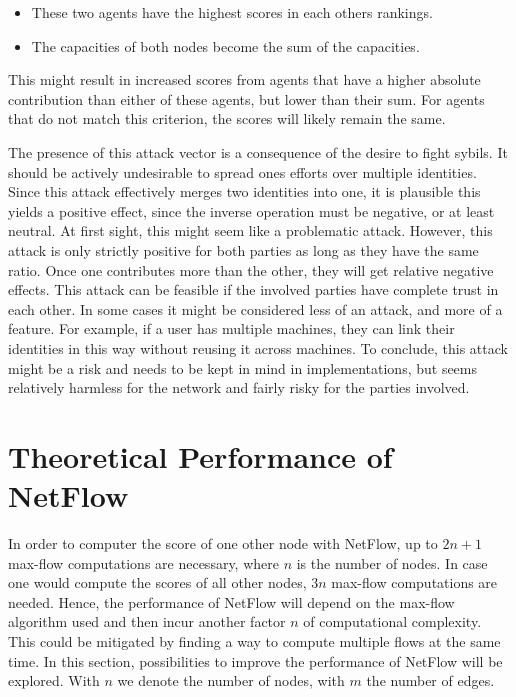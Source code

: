 \documentclass[a4paper,11pt]{book}
\theoremstyle{definition}
\begin{document}
\begin{itemize}
    \item These two agents have the highest scores in each others rankings. 
    \item The capacities of both nodes become the sum of the capacities.
\end{itemize}

This might result in increased scores from agents that have a higher absolute contribution
than either of these agents, but lower than their sum. For agents that do not match this
criterion, the scores will likely remain the same.

The presence of this attack vector is a consequence of the desire to fight sybils. It should be
actively undesirable to spread ones efforts over multiple identities. Since this attack 
effectively merges two identities into one, it is plausible this yields a positive effect,
since the inverse operation must be negative, or at least neutral. At first sight, this
might seem like a problematic attack. However, this attack is only strictly positive for both parties as long
as they have the same ratio. Once one contributes more than the other, they will get relative negative
effects. This attack can be feasible if the involved parties have complete trust in each other. In some
cases it might be considered less of an attack, and more of a feature. For example, if a user
has multiple machines, they can link their identities in this way without reusing it across machines.
To conclude, this attack might be a risk and needs to be kept in mind in implementations, but seems relatively
harmless for the network and fairly risky for the parties involved.


\section{Theoretical Performance of NetFlow}

In order to computer the score of one other node with NetFlow, up to $2n+1$ max-flow
computations are necessary, where $n$ is the number of nodes. In case one would compute
the scores of all other nodes, $3n$ max-flow computations are needed. Hence, the
performance of NetFlow will depend on the max-flow algorithm used and then incur
another factor $n$ of computational complexity. This could be mitigated by finding
a way to compute multiple flows at the same time. In this section, possibilities
to improve the performance of NetFlow will be explored. With $n$ we denote
the number of nodes, with $m$ the number of edges.
\end{document}
